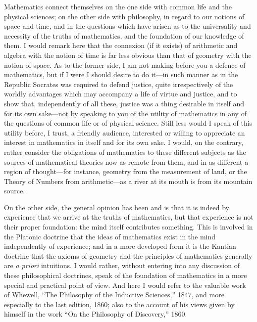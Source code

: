 \documentclass[11pt,a4paper]{article}
\begin{document}
Mathematics connect themselves on the one side with common life and the
physical sciences; on the other side with philosophy, in regard to our
notions of space and time, and in the questions which have arisen as to
the universality and necessity of the truths of mathematics, and the
foundation of our knowledge of them. I would remark here that the
connexion (if it exists) of arithmetic and algebra with the notion of
time is far less obvious than that of geometry with the notion of space.
As to the former side, I am not making before you a defence of
mathematics, but if I were I should desire to do it---in such manner as
in the Republic Socrates was required to defend justice, quite
irrespectively of the worldly advantages which may accompany a life of
virtue and justice, and to show that, independently of all these,
justice was a thing desirable in itself and for its own sake---not by
speaking to you of the utility of mathematics in any of the questions
of common life or of physical science. Still less would I speak of this
utility before, I trust, a friendly audience, interested or willing to
appreciate an interest in mathematics in itself and for its own sake. I
would, on the contrary, rather consider the obligations of mathematics
to these different subjects as the sources of mathematical theories now
as remote from them, and in as different a region of thought---for
instance, geometry from the measurement of land, or the Theory of
Numbers from arithmetic---as a river at its mouth is from its mountain
source.

On the other side, the general opinion has been and is that it is indeed
by experience that we arrive at the truths of mathematics, but that
experience is not their proper foundation: the mind itself contributes
something. This is involved in the Platonic doctrine that the ideas of
mathematics exist in the mind independently of experience; and in a more
developed form it is the Kantian doctrine that the axioms of geometry
and the principles of mathematics generally are \textit{a priori}
intuitions. I would rather, without entering into any discussion of
these philosophical doctrines, speak of the foundation of mathematics in
a more special and practical point of view. And here I would refer to
the valuable work of Whewell, ``The Philosophy of the Inductive
Sciences,'' 1847, and more especially to the last edition, 1860; also to
the account of his views given by himself in the work ``On the
Philosophy of Discovery,'' 1860.
\end{document}
